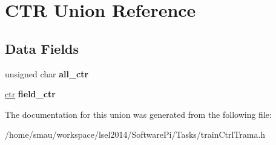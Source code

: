 \hypertarget{unionCTR}{\section{C\-T\-R Union Reference}
\label{unionCTR}
}
\subsection*{Data Fields}
\begin{DoxyCompactItemize}
\item 
\hypertarget{unionCTR_aabf0301e3249e82d9b01b2c38645808f}{unsigned char {\bfseries all\-\_\-ctr}}\label{unionCTR_aabf0301e3249e82d9b01b2c38645808f}

\item 
\hypertarget{unionCTR_ad058db3554cf4526ecbd99dd9a787b48}{\hyperlink{structctr}{ctr} {\bfseries field\-\_\-ctr}}\label{unionCTR_ad058db3554cf4526ecbd99dd9a787b48}

\end{DoxyCompactItemize}


The documentation for this union was generated from the following file\-:\begin{DoxyCompactItemize}
\item 
/home/smau/workspace/lsel2014/\-Software\-Pi/\-Tasks/train\-Ctrl\-Trama.\-h\end{DoxyCompactItemize}
